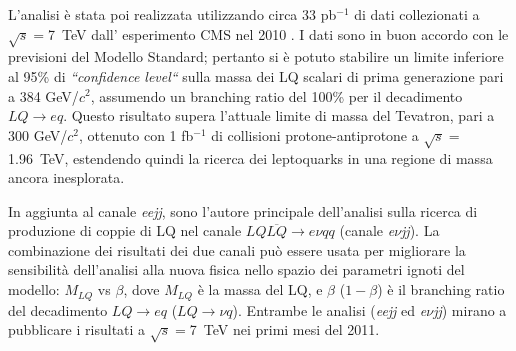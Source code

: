 \documentclass[10pt, a4paper]{article}
\begin{document}
L'analisi \`e stata poi realizzata utilizzando circa 33 pb$^{-1}$ di dati collezionati a $\sqrt{s}=$7~TeV dall' esperimento CMS nel 2010 
\cite{Khachatryan:2010mp,EXO-10-005,AN-2010-230}. 
I dati sono in buon accordo con le previsioni del Modello Standard; pertanto si \`e potuto stabilire un limite inferiore al 95\% di {\it ``confidence level``} 
sulla massa dei LQ scalari di prima generazione pari a 384 GeV/$c^2$, assumendo un branching ratio del 100\% per il decadimento $LQ\rightarrow eq$. 
Questo risultato supera l'attuale limite di massa del Tevatron, pari a 300 GeV/$c^2$, ottenuto con 1 fb$^{-1}$ di collisioni 
protone-antiprotone a $\sqrt{s}=$1.96~TeV, estendendo quindi la ricerca dei leptoquarks in una regione di massa ancora inesplorata. 

In aggiunta al canale {\it eejj}, sono l'autore principale dell'analisi sulla ricerca di produzione di coppie di LQ nel canale 
$LQ\overline{LQ} \rightarrow e\nu qq$ \cite{AN-2010-361} (canale {\it e$\nu$jj}).
La combinazione dei risultati dei due canali pu\`o essere usata per migliorare la 
sensibilit\`a dell'analisi alla nuova fisica nello spazio dei parametri ignoti del modello: $M_{LQ}$ vs $\beta$, 
dove $M_{LQ}$  \`e la massa del LQ, e $\beta$ ($1-\beta$) \`e il branching ratio del decadimento $LQ\rightarrow eq$ 
($LQ\rightarrow \nu q$). Entrambe le analisi ({\it eejj} ed {\it e$\nu$jj}) mirano a pubblicare i risultati a $\sqrt{s}=$7~TeV nei primi 
mesi del 2011.

\clearpage


\end{document}
